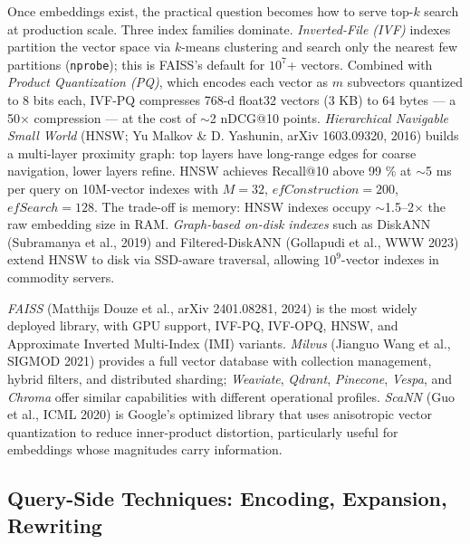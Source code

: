 \documentclass{article}
\begin{document}
Once embeddings exist, the practical question becomes how to serve top-\(k\) search at production scale. Three index families dominate. \emph{Inverted-File (IVF)} indexes partition the vector space via \(k\)-means clustering and search only the nearest few partitions (\texttt{nprobe}); this is FAISS's default for \(10^7\)+ vectors. Combined with \emph{Product Quantization (PQ)}, which encodes each vector as \(m\) subvectors quantized to 8 bits each, IVF-PQ compresses 768-d float32 vectors (3 KB) to 64 bytes --- a 50× compression --- at the cost of $\sim$2 nDCG@10 points. \emph{Hierarchical Navigable Small World} (HNSW; Yu Malkov \& D. Yashunin, arXiv 1603.09320, 2016) builds a multi-layer proximity graph: top layers have long-range edges for coarse navigation, lower layers refine. HNSW achieves Recall@10 above 99 \% at $\sim$5 ms per query on 10M-vector indexes with \(M=32\), \(efConstruction=200\), \(efSearch=128\). The trade-off is memory: HNSW indexes occupy $\sim$1.5--2× the raw embedding size in RAM. \emph{Graph-based on-disk indexes} such as DiskANN (Subramanya et al., 2019) and Filtered-DiskANN (Gollapudi et al., WWW 2023) extend HNSW to disk via SSD-aware traversal, allowing \(10^9\)-vector indexes in commodity servers.

\emph{FAISS} (Matthijs Douze et al., arXiv 2401.08281, 2024) is the most widely deployed library, with GPU support, IVF-PQ, IVF-OPQ, HNSW, and Approximate Inverted Multi-Index (IMI) variants. \emph{Milvus} (Jianguo Wang et al., SIGMOD 2021) provides a full vector database with collection management, hybrid filters, and distributed sharding; \emph{Weaviate}, \emph{Qdrant}, \emph{Pinecone}, \emph{Vespa}, and \emph{Chroma} offer similar capabilities with different operational profiles. \emph{ScaNN} (Guo et al., ICML 2020) is Google's optimized library that uses anisotropic vector quantization to reduce inner-product distortion, particularly useful for embeddings whose magnitudes carry information.

\subsection{Query-Side Techniques: Encoding, Expansion, Rewriting}\label{query-side-techniques-encoding-expansion-rewriting}
\end{document}
